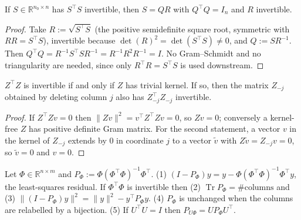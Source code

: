 \begin{lemma}\label{lem:dd:orthFactor}
  \leanok
If $S\in\mathbb R^{n_0\times n}$ has $S^\top S$ invertible, then $S=QR$ with $Q^\top Q=I_n$ and $R$ invertible.
\end{lemma}

\begin{proof}
  \leanok
Take $R:=\sqrt{S^\top S}$ (the positive semidefinite square root, symmetric with $RR=S^\top S$), invertible because $\det(R)^2=\det(S^\top S)\neq0$,
and $Q:=SR^{-1}$. Then $Q^\top Q=R^{-1}S^\top SR^{-1}=R^{-1}R^2R^{-1}=I$. No Gram--Schmidt and no triangularity are needed, since only
$R^\top R=S^\top S$ is used downstream.
\end{proof}

\begin{lemma}\label{lem:dd:fullRank}
  \leanok
$Z^\top Z$ is invertible if and only if $Z$ has trivial kernel. If so, then the matrix $Z_{-j}$ obtained by deleting column $j$ also has
$Z_{-j}^\top Z_{-j}$ invertible.
\end{lemma}

\begin{proof}
  \leanok
If $Z^\top Zv=0$ then $\|Zv\|^2=v^\top Z^\top Zv=0$, so $Zv=0$; conversely a kernel-free $Z$ has positive definite Gram matrix. For the second statement, a vector
$v$ in the kernel of $Z_{-j}$ extends by $0$ in coordinate $j$ to a vector $\tilde v$ with $Z\tilde v=Z_{-j}v=0$, so $\tilde v=0$ and $v=0$.
\end{proof}

\begin{lemma}\label{lem:dd:gramProjectorFacts}
  \leanok
Let $\Phi\in\mathbb R^{n\times m}$ and $P_\Phi:=\Phi(\Phi^\top\Phi)^{-1}\Phi^\top$. (1) $(I-P_\Phi)y=y-\Phi(\Phi^\top\Phi)^{-1}\Phi^\top y$, the least-squares residual. If $\Phi^\top\Phi$ is invertible then (2) $\operatorname{Tr}P_\Phi=\#\text{columns}$ and
(3) $\|(I-P_\Phi)y\|^2=\|y\|^2-y^\top P_\Phi y$. (4) $P_\Phi$ is unchanged when the columns are relabelled by a bijection. (5) If $U^\top U=I$ then $P_{U\Phi}=UP_\Phi U^\top$.
\end{lemma}

